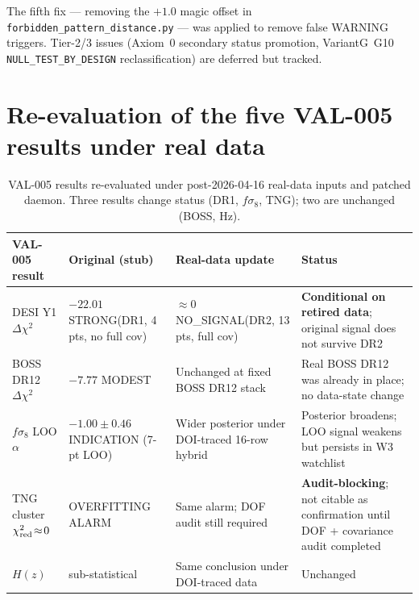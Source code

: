 \documentclass[11pt]{article}
\begin{document}
The fifth fix --- removing the $+1.0$ magic offset in
\texttt{forbidden\_pattern\_distance.py} --- was applied to remove false
WARNING triggers. Tier-2/3 issues (Axiom~0 secondary status promotion,
VariantG~G10 \texttt{NULL\_TEST\_BY\_DESIGN} reclassification) are
deferred but tracked.

\section{Re-evaluation of the five VAL-005 results under real data}

\begin{table}[h]
\centering
\footnotesize
\setlength{\tabcolsep}{6pt}
\begin{tabularx}{\linewidth}{@{}L{2.8cm} Y Y L{4.0cm}@{}}
\toprule
{}
\textbf{VAL-005 result} & \textbf{Original (stub)} & \textbf{Real-data update} & \textbf{Status} \\
\midrule
DESI Y1 $\Delta\chi^2$ &
$-22.01$ STRONG\newline(DR1, 4 pts, no full cov) &
$\approx 0$ NO\_SIGNAL\newline(DR2, 13 pts, full cov) &
\textcolor{ered}{\textbf{Conditional on retired data}}; original signal does not survive DR2 \\
\addlinespace[2pt]
BOSS DR12 $\Delta\chi^2$ &
$-7.77$ MODEST &
Unchanged at fixed BOSS DR12 stack &
Real BOSS DR12 was already in place; no data-state change \\
\addlinespace[2pt]
$f\sigma_8$ LOO $\alpha$ &
$-1.00 \pm 0.46$ INDICATION (7-pt LOO) &
Wider posterior under DOI-traced 16-row hybrid &
Posterior broadens; LOO signal weakens but persists in W3 watchlist \\
\addlinespace[2pt]
TNG cluster $\chi^2_{\rm red}\!\approx\!0$ &
OVERFITTING ALARM &
Same alarm; DOF audit still required &
\textcolor{ered}{\textbf{Audit-blocking}}; not citable as confirmation until DOF + covariance audit completed \\
\addlinespace[2pt]
$H(z)$ &
sub-statistical &
Same conclusion under DOI-traced data &
Unchanged \\
\bottomrule
\end{tabularx}
\caption{VAL-005 results re-evaluated under post-2026-04-16 real-data
inputs and patched daemon. Three results change status (DR1, $f\sigma_8$,
TNG); two are unchanged (BOSS, Hz).}
\label{tab:val005-reeval}
\end{table}
\end{document}
